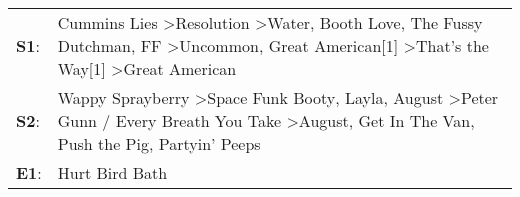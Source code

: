 \begin{supertabular}{p{0.03\textwidth}p{0.92\textwidth}}
 \textbf{S1}:  &  Cummins Lies\textsuperscript{} \textgreater \enspace Resolution\textsuperscript{} \textgreater \enspace Water\textsuperscript{}, \enspace Booth Love\textsuperscript{}, \enspace The Fussy Dutchman\textsuperscript{}, \enspace FF\textsuperscript{} \textgreater \enspace Uncommon\textsuperscript{}, \enspace Great American[1]\textsuperscript{} \textgreater \enspace That's the Way[1]\textsuperscript{} \textgreater \enspace Great American\textsuperscript{}  \enspace  \\
 \textbf{S2}:  &                                             Wappy Sprayberry\textsuperscript{} \textgreater \enspace Space Funk Booty\textsuperscript{}, \enspace Layla\textsuperscript{}, \enspace August\textsuperscript{} \textgreater \enspace Peter Gunn / Every Breath You Take\textsuperscript{} \textgreater \enspace August\textsuperscript{}, \enspace Get In The Van\textsuperscript{}, \enspace Push the Pig\textsuperscript{}, \enspace Partyin' Peeps\textsuperscript{}  \enspace  \\
 \textbf{E1}:  &                                                                                                                                                                                                                                                                                                                                                                                                                                      Hurt Bird Bath\textsuperscript{}  \enspace  \\
\end{supertabular}
